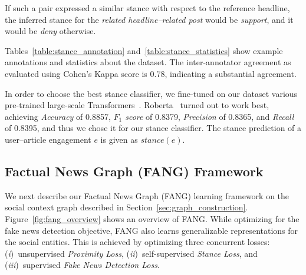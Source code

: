 \documentclass[sigconf,anonymous]{acmart}
\theoremstyle{definition}
\theoremstyle{hypothesis}
\begin{document}
If such a pair expressed a similar stance with respect to the reference headline, the inferred stance for the \emph{related headline--related post} would be \textit{support}, and it would be \textit{deny} otherwise.

Tables~\ref{table:stance_annotation} and~\ref{table:stance_statistics} show example annotations and statistics about the dataset. The inter-annotator agreement as evaluated using Cohen's Kappa score is 
0.78, indicating a substantial agreement.

In order to choose the best stance classifier, we fine-tuned on our dataset various pre-trained large-scale Transformers~\cite{devlin2019bert,yang2019xlnet,liu2019roberta}. Roberta~\cite{liu2019roberta} turned out to work best, achieving \textit{Accuracy} of 0.8857, \textit{$F_1$ score} of 0.8379, \textit{Precision} of 0.8365, and \textit{Recall} of 0.8395, 
and thus we chose it for our stance classifier. The stance prediction of a user--article engagement $e$ is given as $stance(e)$. 




\subsection{Factual News Graph (FANG) Framework}\label{sec:fang}

We next describe our Factual News Graph (FANG) learning framework on the social context graph described in Section~\ref{sec:graph_construction}. Figure~\ref{fig:fang_overview} shows an overview of FANG. 
While optimizing for the fake news detection objective, FANG also learns generalizable representations for the social entities. This is achieved by optimizing three concurrent losses: (\emph{i})~unsupervised \textit{Proximity Loss}, (\emph{ii})~self-supervised \textit{Stance Loss}, and (\emph{iii})~supervised \textit{Fake News Detection Loss}.
\end{document}
